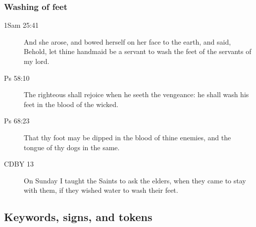 		\subsubsection{Washing of feet} %
		
			\begin{description}
			\item[1Sam 25:41] And she arose, and bowed herself on her face to the earth, and said, Behold, let thine handmaid be a servant to wash the feet of the servants of my lord.
			\item[Ps 58:10] The righteous shall rejoice when he seeth the vengeance: he shall wash his feet in the blood of the wicked.
			\item[Ps 68:23] That thy foot may be dipped in the blood of thine enemies, and the tongue of thy dogs in the same.
			\item[CDBY 13] On Sunday I taught the Saints to ask the elders, when they came to stay with them, if they wished water to wash their feet.
			\end{description}

	\subsection{Keywords, signs, and tokens} %


